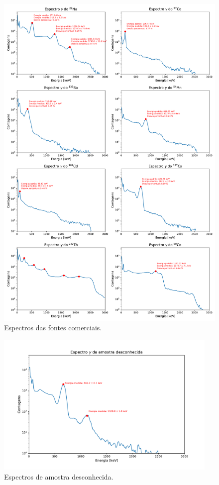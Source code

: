 \documentclass[a4paper, 11pt, notitlepage]{article}
\numberwithin{equation}{section}  %
\begin{document}
\begin{figure}[H]
  \centering
  \includegraphics[width=1.00\textwidth]{todos_espectros.pdf}
  \caption{Espectros das fontes comerciais.}
  \label{fig:amostras.comerciais}
\end{figure}

\begin{figure}[H]
  \centering
  \includegraphics[width=0.95\textwidth]{amostra_desconhecida.pdf}
  \caption{Espectros de amostra desconhecida.}
  \label{fig:amostra.desconhecida}
\end{figure}
\end{document}
